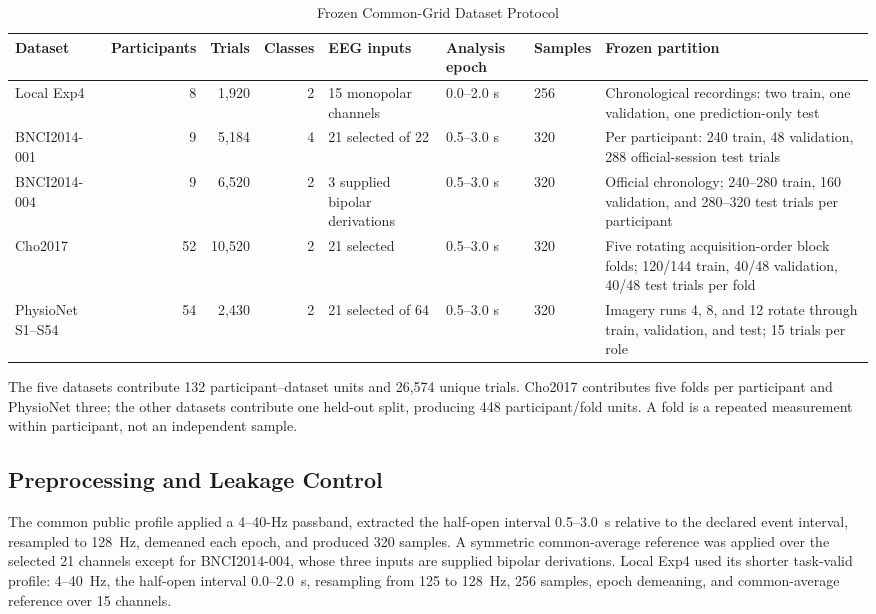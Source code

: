 \documentclass[journal,twoside,web]{template/ieeecolor2-tectonic}
\begin{document}
\begin{table}[t]
\caption{Frozen Common-Grid Dataset Protocol}
\label{tab:datasets}
\centering
\scriptsize
\setlength{\tabcolsep}{3.4pt}
\begin{tabular}{p{2.35cm}rrrp{1.8cm}p{2.0cm}p{1.5cm}p{5.0cm}}
\toprule
Dataset & Participants & Trials & Classes & EEG inputs & Analysis epoch & Samples & Frozen partition \\
\midrule
Local Exp4 & 8 & 1,920 & 2 & 15 monopolar channels & 0.0--2.0 s & 256 & Chronological recordings: two train, one validation, one prediction-only test \\
BNCI2014-001 & 9 & 5,184 & 4 & 21 selected of 22 & 0.5--3.0 s & 320 & Per participant: 240 train, 48 validation, 288 official-session test trials \\
BNCI2014-004 & 9 & 6,520 & 2 & 3 supplied bipolar derivations & 0.5--3.0 s & 320 & Official chronology; 240--280 train, 160 validation, and 280--320 test trials per participant \\
Cho2017 & 52 & 10,520 & 2 & 21 selected & 0.5--3.0 s & 320 & Five rotating acquisition-order block folds; 120/144 train, 40/48 validation, 40/48 test trials per fold \\
PhysioNet S1--S54 & 54 & 2,430 & 2 & 21 selected of 64 & 0.5--3.0 s & 320 & Imagery runs 4, 8, and 12 rotate through train, validation, and test; 15 trials per role \\
\bottomrule
\end{tabular}
\end{table}

The five datasets contribute 132 participant--dataset units and 26,574 unique trials. Cho2017 contributes five folds per participant and PhysioNet three; the other datasets contribute one held-out split, producing 448 participant/fold units. A fold is a repeated measurement within participant, not an independent sample.

\subsection{Preprocessing and Leakage Control}

The common public profile applied a 4--40-Hz passband, extracted the half-open interval 0.5--3.0~s relative to the declared event interval, resampled to 128~Hz, demeaned each epoch, and produced 320 samples. A symmetric common-average reference was applied over the selected 21 channels except for BNCI2014-004, whose three inputs are supplied bipolar derivations. Local Exp4 used its shorter task-valid profile: 4--40~Hz, the half-open interval 0.0--2.0~s, resampling from 125 to 128~Hz, 256 samples, epoch demeaning, and common-average reference over 15 channels.
\end{document}
